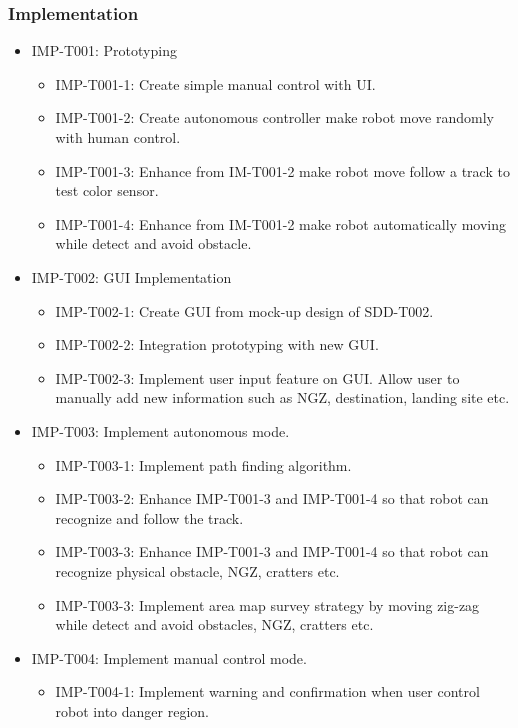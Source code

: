 \documentclass[11pt, a4paper]{article}
\begin{document}
		\subsubsection{Implementation}
		\begin{itemize}
			\item IMP-T001: Prototyping
			\begin{itemize}
					\item IMP-T001-1: Create simple manual control with UI.				
					\item IMP-T001-2: Create autonomous controller make robot move randomly with human control.
					\item IMP-T001-3: Enhance from IM-T001-2 make robot move follow a track to test color sensor.
					\item IMP-T001-4: Enhance from IM-T001-2 make robot automatically moving while detect and avoid obstacle. 
			\end{itemize}
			\item IMP-T002: GUI Implementation
			\begin{itemize}
					\item IMP-T002-1: Create GUI from mock-up design of SDD-T002.
					\item IMP-T002-2: Integration prototyping with new GUI.
					\item IMP-T002-3: Implement user input feature on GUI. Allow user to manually add new information such as NGZ, destination, landing site etc.
			\end{itemize}
			\item IMP-T003: Implement autonomous mode.
			\begin{itemize}
					\item IMP-T003-1: Implement path finding algorithm.
					\item IMP-T003-2: Enhance IMP-T001-3 and IMP-T001-4 so that robot can recognize and follow the track.
					\item IMP-T003-3: Enhance IMP-T001-3 and IMP-T001-4 so that robot can recognize physical obstacle, NGZ, cratters etc. 
					\item IMP-T003-3: Implement area map survey strategy by moving zig-zag while detect and avoid obstacles, NGZ, cratters etc.
			\end{itemize}
			\item IMP-T004: Implement manual control mode.
			\begin{itemize}
					\item IMP-T004-1: Implement warning and confirmation when user control robot into danger region.

\end{itemize}
\end{itemize}
\end{document}
